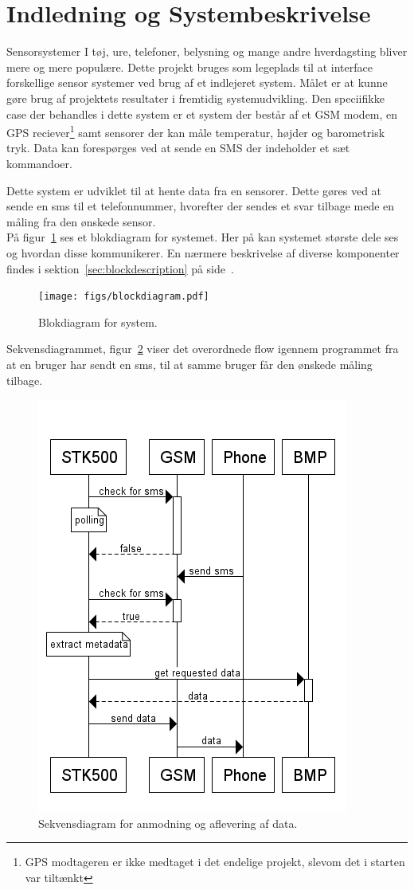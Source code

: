\section{Indledning og Systembeskrivelse}

Sensorsystemer I tøj, ure, telefoner, belysning og mange andre hverdagsting bliver mere og mere populære. Dette projekt bruges som 
legeplads til at interface forskellige sensor systemer ved brug af et indlejeret system. Målet er at kunne gøre brug af projektets 
resultater i fremtidig systemudvikling. Den speciifikke case der behandles i dette system er et system der består af et GSM modem, 
en GPS reciever\footnote{GPS modtageren er ikke medtaget i det endelige projekt, slevom det i starten var tiltænkt} samt sensorer der kan måle temperatur, 
højder og barometrisk tryk. Data kan forespørges ved at sende en SMS der indeholder et sæt kommandoer.

Dette system er udviklet til at hente data fra en sensorer. Dette gøres ved at sende en sms til et telefonnummer, hvorefter der 
sendes et svar tilbage mede en måling fra den ønskede sensor.\\

På figur~\ref{fig:blockdiagram} ses et blokdiagram for systemet. Her på kan systemet største dele ses og hvordan disse kommunikerer. 
En nærmere beskrivelse af diverse komponenter findes i sektion~\ref{sec:blockdescription} på side~\pageref{sec:blockdescription}.

\vskip 0.5cm
\begin{figure}[h]
	\centering
	\texttt{[image: figs/blockdiagram.pdf]}
	\caption{Blokdiagram for system.}
	\label{fig:blockdiagram}
\end{figure}
\vskip 0.5cm

Sekvensdiagrammet, figur~\ref{fig:seq-getdata} viser det overordnede flow igennem programmet fra at en bruger har sendt en sms, til at samme bruger får den ønskede måling tilbage.

\begin{figure}[h]
	\centering
	\includegraphics[width=0.56\linewidth]{figs/seq-getdata.png}
	\caption{Sekvensdiagram for anmodning og aflevering af data.}
	\label{fig:seq-getdata}
\end{figure}


